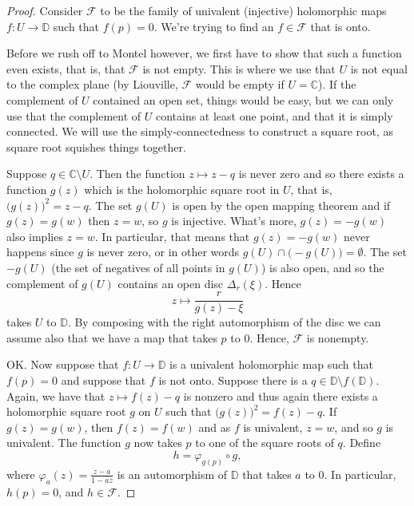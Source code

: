 \documentclass[12pt,openany]{book}
\newcommand{\C}{{\mathbb{C}}}
\newcommand{\D}{{\mathbb{D}}}
\newcommand{\sF}{{\mathscr{F}}}
\theoremstyle{plain}
\theoremstyle{remark}
\theoremstyle{definition}
\theoremstyle{exercise}
\theoremstyle{example}
\begin{document}
\begin{proof}
Consider $\sF$ to be the family of univalent (injective) holomorphic
maps $f \colon U \to \D$ such that $f(p) = 0$.  We're trying to find
an $f \in \sF$ that is onto.

Before we rush off to Montel however, we first have to show that such a
function even exists, that is, that $\sF$ is not empty.  This is where we
use that $U$ is not equal to the complex plane (by Liouville, $\sF$
would be empty if $U = \C$).  If the complement of $U$ contained an open
set, things would be easy, but we can only use that the complement of $U$
contains at least one point, and that it is simply connected.  We will use
the simply-connectedness to construct a square root, as square root squishes
things together.

Suppose $q \in \C \setminus U$.  Then the function $z \mapsto z-q$ is never
zero and so there exists a function $g(z)$ which is the holomorphic
square root in $U$, that is, ${\bigl(g(z)\bigr)}^2 = z-q$.
The set $g(U)$ is open by the open mapping theorem and
if $g(z)=g(w)$ then $z=w$, so $g$ is injective.  What's more,
$g(z)=-g(w)$ also implies $z=w$.  In particular, that means that $g(z) =
-g(w)$ never happens since $g$ is never zero,
or in other words $g(U) \cap \bigl( - g(U) \bigr) = \emptyset$.  The set
$- g(U)$ (the set of negatives of all points in $g(U)$) is also open, and so
the complement of $g(U)$ contains an open disc $\Delta_r(\xi)$.  Hence
\begin{equation*}
z \mapsto \frac{r}{g(z)-\xi}
\end{equation*}
takes $U$ to $\D$.
By composing with the right automorphism of the disc we can assume also that
we have a map that takes $p$ to $0$.  Hence, $\sF$ is nonempty.

OK.  Now suppose that $f \colon U \to \D$ is a univalent holomorphic map
such that $f(p) = 0$ and suppose that $f$ is not onto.  Suppose there is a
$q \in \D \setminus f(\D)$.  Again, we have that $z \mapsto f(z)-q$ is
nonzero and thus again there exists a holomorphic square root $g$ on $U$ such that
${\bigl(g(z)\bigr)}^2 = f(z)-q$.  If $g(z)=g(w)$, then $f(z)=f(w)$ and as
$f$ is univalent, $z=w$, and so $g$ is univalent.  The function $g$
now takes $p$ to one of the square roots of $q$.  Define
\begin{equation*}
h = \varphi_{g(p)} \circ g ,
\end{equation*}
where
$\varphi_a(z) = \frac{z-a}{1-\bar{a}z}$ is an automorphism of $\D$ that
takes $a$ to $0$.  In particular, $h(p) = 0$, and $h \in \sF$.


\end{proof}
\end{document}
